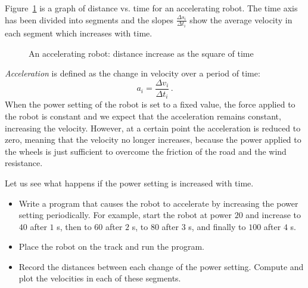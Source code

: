 Figure~\ref{fig.instant-v} is a graph of distance vs. time for an accelerating robot. The time axis has been divided into segments and the slopes $\displaystyle\frac{\Delta s_i}{\Delta t_i}$ show the average velocity in each segment which increases with time.

\begin{figure}
\begin{center}
\caption{An accelerating robot: distance increase as the square of time}\label{fig.instant-v}
\end{center}
\end{figure}

\emph{Acceleration} is defined as the change in velocity over a period of time:
\[a_i = \frac{\Delta v_i}{\Delta t_i}\,.\]
When the power setting of the robot is set to a fixed value, the force applied to the robot is constant and we expect that the acceleration remains constant, increasing the velocity. However, at a certain point the acceleration is reduced to zero, meaning that the velocity no longer increases, because the power applied to the wheels is just sufficient to overcome the friction of the road and the wind resistance.

Let us see what happens if the power setting is increased with time.

\begin{framed}
\begin{itemize}
\item Write a program that causes the robot to accelerate by increasing the power setting periodically. For example, start the robot at power $20$ and increase to $40$ after $1$ s, then to $60$ after $2$ s, to $80$ after $3$ s, and finally to $100$ after $4$ s.
\item Place the robot on the track and run the program.
\item Record the distances between each change of the power setting. Compute and plot the velocities in each of these segments.
\end{itemize}
\end{framed}

